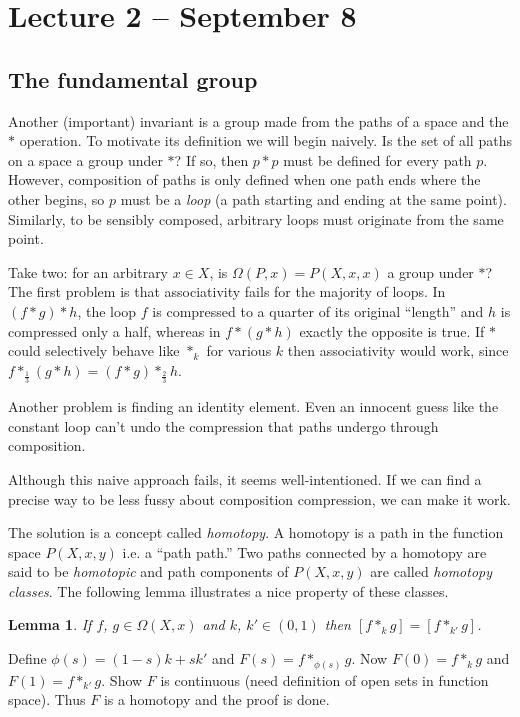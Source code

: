 \documentclass[letterpaper]{article}
\newtheorem{lemma}[theorem]{Lemma}
\newenvironment{proof}[1][Proof]{\begin{trivlist}
\item[\hskip \labelsep {\bfseries #1}]}{\end{trivlist}}
\begin{document}
\section{Lecture 2 -- September 8}

\subsection{The fundamental group}

Another (important) invariant is a group made from the paths of a space and the $\ast$ operation. To motivate its definition we will begin naively. Is the set of all paths on a space a group under $\ast$? If so, then $p \ast p$ must be defined for every path $p$. However, composition of paths is only defined when one path ends where the other begins, so $p$ must be a \emph{loop} (a path starting and ending at the same point). Similarly, to be sensibly composed, arbitrary loops must originate from the same point.

Take two: for an arbitrary $x \in X$, is $\Omega(P, x) = P(X, x, x)$ a group under $\ast$? The first problem is that associativity fails for the majority of loops. In $(f \ast g) \ast h$, the loop $f$ is compressed to a quarter of its original ``length'' and $h$ is compressed only a half, whereas in $f \ast (g \ast h)$ exactly the opposite is true. If $\ast$ could selectively behave like $\ast_k$ for various $k$ then associativity would work, since $f \ast_\frac{1}{3} (g \ast h) = (f \ast g) \ast_\frac{2}{3} h$.

Another problem is finding an identity element. Even an innocent guess like the constant loop can't undo the compression that paths undergo through composition.

Although this naive approach fails, it seems well-intentioned. If we can find a precise way to be less fussy about composition compression, we can make it work.

The solution is a concept called \emph{homotopy}. A homotopy is a path in the function space $P(X, x, y)$ i.e. a ``path path.'' Two paths connected by a homotopy are said to be \emph{homotopic} and path components of $P(X, x, y)$ are called \emph{homotopy classes}. The following lemma illustrates a nice property of these classes.

\begin{lemma}
If $f$, $g \in \Omega(X, x)$ and $k$, $k' \in (0, 1)$ then $[f \ast_k g] = [f \ast_{k'} g]$.
\end{lemma}
\begin{proof}
Define $\phi(s) = (1 - s)k + sk'$ and $F(s) = f \ast_{\phi(s)} g$. Now $F(0) = f \ast_k g$ and $F(1) = f \ast_{k'} g$. Show $F$ is continuous (need definition of open sets in function space). Thus $F$ is a homotopy and the proof is done.
\end{proof}
\end{document}
